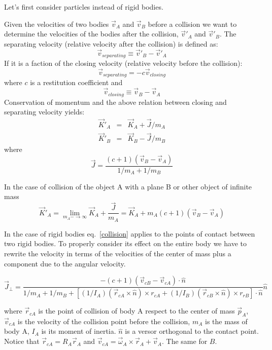 \documentclass[12pt]{article}
\begin{document}
Let's first consider particles instead of rigid bodies.

Given the velocities of two bodies $\vec v_A$ and $\vec v_B$ before a collision we want to determine the velocities of the bodies after the collision, $\vec v'_A$ and $\vec v'_B$. The separating velocity (relative velocity after the collision) is defined as:
\begin{equation}
\vec v_{separating} \equiv \vec v'_B - \vec v'_A
\end{equation}
If it is a faction of the closing velocity (relative velocity before the collision):
\begin{equation}
\vec v_{separating} = -c \vec v_{closing}
\label{collision}
\end{equation}
where $c$ is a restitution coefficient and 
\begin{equation}
\vec v_{closing} \equiv \vec v_B - \vec v_A
\end{equation}
Conservation of momentum and the above relation between closing and separating velocity yields:
\begin{eqnarray}
\vec K'_A &=& \vec K_A + \vec J/{m_A} \\
\vec K'_B &=& \vec K_B - \vec J/{m_B} 
\end{eqnarray}
where
\begin{equation}
\vec J = \frac{(c+1)(\vec v_B-\vec v_A)}{1/m_A+1/m_B}
\end{equation}

In the case of collision of the object A with a plane B or other object of infinite mass
\begin{equation}
\vec K'_A = \lim_{m_A-\rightarrow \infty} \vec K_A + \frac{\vec J}{m_A} = \vec K_A + m_A (c+1)(\vec v_B-\vec v_A)
\end{equation}

In the case of rigid bodies eq.~\ref{collision} applies to the points of contact between two rigid bodies. To properly consider its effect on the entire body we have to rewrite the velocity in terms of the velocities of the center of mass plus a component due to the angular velocity.

\begin{equation}
{\vec J}_{\perp} = \frac {-(c+1) (\vec v_{cB} - \vec v_{cA}) \cdot \hat n}{1/m_A+1/m_B + \left[ (1/I_A)(\vec r_{cA} \times \hat n)\times r_{cA}  + (1/I_B)(\vec r_{cB} \times \hat n) \times r_{rB}\right] \cdot {\hat n}}{\hat n}
\label{impulse}
\end{equation}

where $\vec r_{cA}$ is the point of collision of body A respect to the center of mass $\vec p_A$, $\vec v_{cA}$ is the velocity of the collision point before the collision, $m_A$ is the mass of body A, $I_A$ is its moment of inertia. $\hat n$ is a versor orthogonal to the contact point. Notice that $\vec r_{cA} = R_A\vec r_A$ and $\vec v_{cA} = \vec \omega_A \times \vec r_A + \vec v_A$. The same for $B$.
\end{document}
